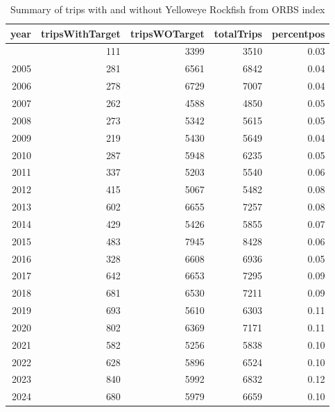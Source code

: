 \documentclass[
  english,
]{article}
\begin{document}
\begin{longtable}{rrrrr}

\caption{\label{tbl-yelloweye_percent_pos_ORBS}Summary of trips with and
without Yelloweye Rockfish from ORBS index}

\tabularnewline

\toprule
year & tripsWithTarget & tripsWOTarget & totalTrips & percentpos \\ 
\midrule\addlinespace[2.5pt]
2004 & 111 & 3399 & 3510 & 0.03 \\ 
2005 & 281 & 6561 & 6842 & 0.04 \\ 
2006 & 278 & 6729 & 7007 & 0.04 \\ 
2007 & 262 & 4588 & 4850 & 0.05 \\ 
2008 & 273 & 5342 & 5615 & 0.05 \\ 
2009 & 219 & 5430 & 5649 & 0.04 \\ 
2010 & 287 & 5948 & 6235 & 0.05 \\ 
2011 & 337 & 5203 & 5540 & 0.06 \\ 
2012 & 415 & 5067 & 5482 & 0.08 \\ 
2013 & 602 & 6655 & 7257 & 0.08 \\ 
2014 & 429 & 5426 & 5855 & 0.07 \\ 
2015 & 483 & 7945 & 8428 & 0.06 \\ 
2016 & 328 & 6608 & 6936 & 0.05 \\ 
2017 & 642 & 6653 & 7295 & 0.09 \\ 
2018 & 681 & 6530 & 7211 & 0.09 \\ 
2019 & 693 & 5610 & 6303 & 0.11 \\ 
2020 & 802 & 6369 & 7171 & 0.11 \\ 
2021 & 582 & 5256 & 5838 & 0.10 \\ 
2022 & 628 & 5896 & 6524 & 0.10 \\ 
2023 & 840 & 5992 & 6832 & 0.12 \\ 
2024 & 680 & 5979 & 6659 & 0.10 \\ 
\bottomrule

\end{longtable}

\endgroup
\end{document}

